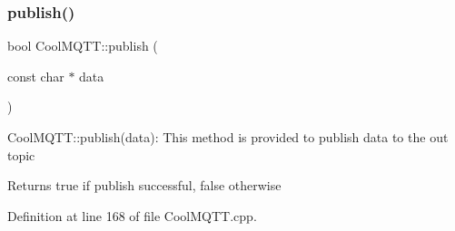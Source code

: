 \subsubsection{\texorpdfstring{publish()}{publish()}\hspace{0.1cm}{\footnotesize\ttfamily [1/2]}}
{\footnotesize\ttfamily bool Cool\+M\+Q\+T\+T\+::publish (\begin{DoxyParamCaption}\item[{const char $\ast$}]{data }\end{DoxyParamCaption})}

Cool\+M\+Q\+T\+T\+::publish(data)\+: This method is provided to publish data to the out topic

\begin{DoxyReturn}{Returns}
true if publish successful, false otherwise 
\end{DoxyReturn}


Definition at line 168 of file Cool\+M\+Q\+T\+T.\+cpp.


